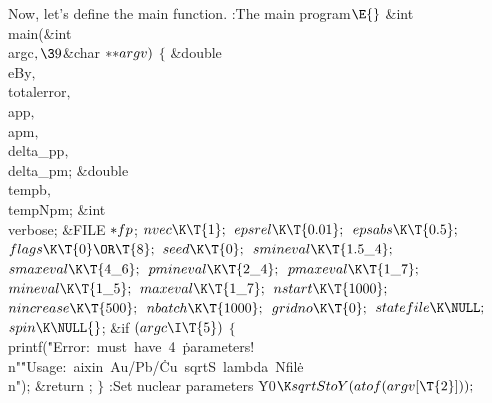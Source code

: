 \documentclass{cweb}
\begin{document}
Now, let's define the main function.
\Y\B\4:The main program\X${}\E{}$\6
\&{int} \\{main}(\&{int} \\{argc}${},\39{}$\&{char} ${}{*}{*}\\{argv}){}$\1\1\2%
\2\6
${}\{{}$\1\6
\&{double} \\{eBy}${},{}$ \\{totalerror}${},{}$ \\{app}${},{}$ \\{apm}${},{}$ %
\\{delta\_pp}${},{}$ \\{delta\_pm};\6
\&{double} \\{tempb}${},{}$ \\{tempNpm};\6
\&{int} \\{verbose};\6
\&{FILE} ${}{*}\\{fp}{}$;\7
${}\\{nvec}\K\T{1};{}$\6
${}\\{epsrel}\K\T{0.01};{}$\6
${}\\{epsabs}\K\T{0.5};{}$\6
${}\\{flags}\K\T{0}\OR\T{8};{}$\6
${}\\{seed}\K\T{0};{}$\6
${}\\{smineval}\K\T{1.5\_4};{}$\6
${}\\{smaxeval}\K\T{4\_6};{}$\6
${}\\{pmineval}\K\T{2\_4};{}$\6
${}\\{pmaxeval}\K\T{1\_7};{}$\6
${}\\{mineval}\K\T{1\_5};{}$\6
${}\\{maxeval}\K\T{1\_7};{}$\6
${}\\{nstart}\K\T{1000};{}$\6
${}\\{nincrease}\K\T{500};{}$\6
${}\\{nbatch}\K\T{1000};{}$\6
${}\\{gridno}\K\T{0};{}$\6
${}\\{statefile}\K\NULL;{}$\6
${}\\{spin}\K\NULL{}$;\7
\&{if} ${}(\\{argc}\I\T{5}){}$\5
${}\{{}$\1\6
\\{printf}(\.{"Error:\ must\ have\ 4\ }\)\.{parameters!\\n"}\.{"Usage:\ aixin\
Au/Pb/}\)\.{Cu\ sqrtS\ lambda\ Nfil}\)\.{e\ \\n"});\6
\&{return} ;\6
\4${}\}{}$\2\7
:Set nuclear parameters\X\6
\.{Y0}${}\K\\{sqrtStoY}(\\{atof}(\\{argv}[\T{2}]));{}$\6
\end{document}

